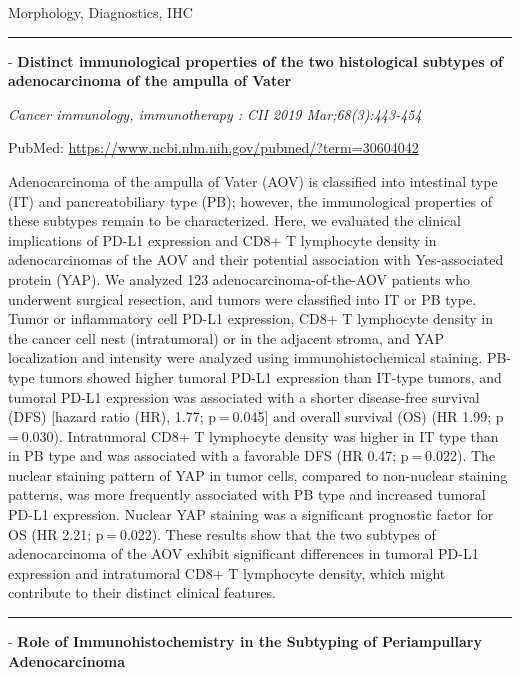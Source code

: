 \documentclass[]{article}
\begin{document}
Morphology, Diagnostics, IHC

\begin{center}\rule{0.5\linewidth}{\linethickness}\end{center}

 - \textbf{Distinct immunological properties of the two histological
subtypes of adenocarcinoma of the ampulla of Vater}

\emph{Cancer immunology, immunotherapy : CII 2019 Mar;68(3):443-454}

PubMed: \url{https://www.ncbi.nlm.nih.gov/pubmed/?term=30604042}

Adenocarcinoma of the ampulla of Vater (AOV) is classified into
intestinal type (IT) and pancreatobiliary type (PB); however, the
immunological properties of these subtypes remain to be characterized.
Here, we evaluated the clinical implications of PD-L1 expression and
CD8+ T lymphocyte density in adenocarcinomas of the AOV and their
potential association with Yes-associated protein (YAP). We analyzed 123
adenocarcinoma-of-the-AOV patients who underwent surgical resection, and
tumors were classified into IT or PB type. Tumor or inflammatory cell
PD-L1 expression, CD8+ T lymphocyte density in the cancer cell nest
(intratumoral) or in the adjacent stroma, and YAP localization and
intensity were analyzed using immunohistochemical staining. PB-type
tumors showed higher tumoral PD-L1 expression than IT-type tumors, and
tumoral PD-L1 expression was associated with a shorter disease-free
survival (DFS) {[}hazard ratio (HR), 1.77; p = 0.045{]} and overall
survival (OS) (HR 1.99; p = 0.030). Intratumoral CD8+ T lymphocyte
density was higher in IT type than in PB type and was associated with a
favorable DFS (HR 0.47; p = 0.022). The nuclear staining pattern of YAP
in tumor cells, compared to non-nuclear staining patterns, was more
frequently associated with PB type and increased tumoral PD-L1
expression. Nuclear YAP staining was a significant prognostic factor for
OS (HR 2.21; p = 0.022). These results show that the two subtypes of
adenocarcinoma of the AOV exhibit significant differences in tumoral
PD-L1 expression and intratumoral CD8+ T lymphocyte density, which might
contribute to their distinct clinical features.

{}

{}

\begin{center}\rule{0.5\linewidth}{\linethickness}\end{center}

 - \textbf{Role of Immunohistochemistry in the Subtyping of
Periampullary Adenocarcinoma}
\end{document}
